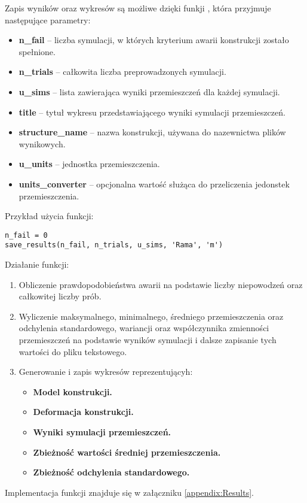 Zapis wyników oraz wykresów są możliwe dzięki funkji , która przyjmuje następujące parametry:
\begin{itemize}
    \item \textbf{n\_fail} – liczba symulacji, w których kryterium awarii konstrukcji zostało spełnione.
    \item \textbf{n\_trials} – całkowita liczba preprowadzonych symulacji.
    \item \textbf{u\_sims} – lista zawierająca wyniki przemieszczeń dla każdej symulacji.
    \item \textbf{title} – tytuł wykresu przedstawiającego wyniki symulacji przemieszczeń.
    \item \textbf{structure\_name} – nazwa konstrukcji, używana do nazewnictwa plików wynikowych.
    \item \textbf{u\_units} – jednostka przemieszczenia.
    \item \textbf{units\_converter} – opcjonalna wartość służąca do przeliczenia jedonstek przemieszczenia.
\end{itemize}
Przykład użycia funkcji:

\begin{lstlisting}
n_fail = 0
save_results(n_fail, n_trials, u_sims, 'Rama', 'm')
\end{lstlisting}
Działanie funkcji:

\begin{enumerate}
    \item Obliczenie prawdopodobieństwa awarii na podstawie liczby niepowodzeń oraz całkowitej liczby prób.
    \item Wyliczenie maksymalnego, minimalnego, średniego przemieszczenia oraz odchylenia standardowego, wariancji oraz współczynnika zmienności przemieszczeń na podstawie wyników symulacji i dalsze zapisanie tych wartości do pliku tekstowego.
    \item Generowanie i zapis wykresów reprezentującyh:
    \begin{itemize}
        \item \textbf{Model konstrukcji.}
        \item \textbf{Deformacja konstrukcji.}
        \item \textbf{Wyniki symulacji przemieszczeń.}
        \item \textbf{Zbieżność wartości średniej przemieszczenia.}
        \item \textbf{Zbieżność odchylenia standardowego.}
    \end{itemize}
\end{enumerate}
Implementacja funkcji znajduje się w załączniku \ref{appendix:Results}.
